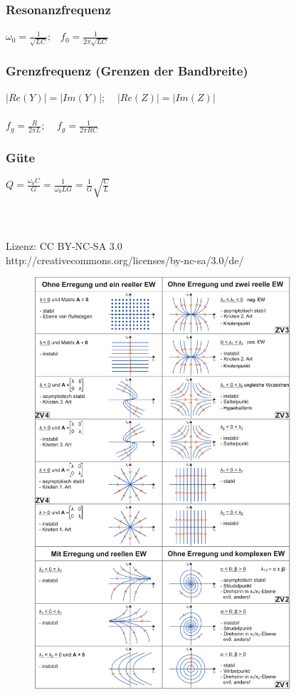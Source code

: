 \documentclass[a4paper,twocolumn,10pt]{article}
\begin{document}
\subsubsection*{Resonanzfrequenz}
$\omega_0 =\frac{1}{\sqrt{LC}};\;\;\;f_0=\frac{1}{2\pi \sqrt{LC}}$
\subsubsection*{Grenzfrequenz (Grenzen der Bandbreite)}
$|Re(Y)|=|Im(Y)|;\;\;\;\;|Re(Z)|=|Im(Z)|$\\\\
$f_g=\frac{R}{2\pi L};\;\;\;\;f_g=\frac{1}{2\pi RC}$
\subsubsection*{Güte}
$Q=\frac{\omega_0 C}{G}=\frac{1}{\omega_0 LG}=\frac{1}{G}\sqrt{\frac{C}{L}}$
\\\\\\\\
Lizenz: CC BY-NC-SA 3.0\\
http://creativecommons.org/licenses/by-nc-sa/3.0/de/
\newpage
\begin{figure}
\begin{center}
\includegraphics[width=0.85\textwidth]{img/Phasenportraits-annotated}
\end{center}
\end{figure}
\end{document}
